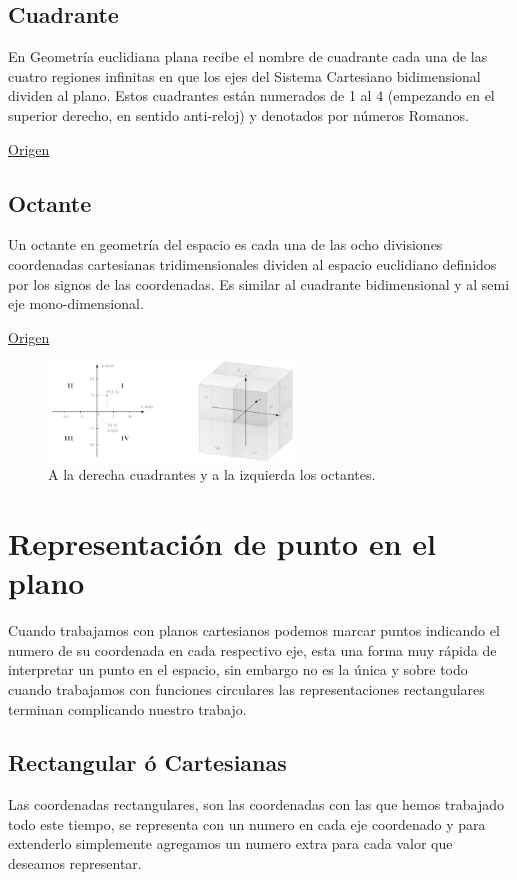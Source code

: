 \documentclass{article}
\begin{document}
\subsection{Cuadrante}
\label{sec:org30ba758}
En Geometría euclidiana plana recibe el nombre de cuadrante cada una de las cuatro regiones infinitas en que los ejes del Sistema Cartesiano bidimensional dividen al plano. Estos cuadrantes están numerados de 1 al 4 (empezando en el superior derecho, en sentido anti-reloj) y denotados por números Romanos.

\href{https://es.wikipedia.org/wiki/Cuadrante\_(geometr\%C3\%ADa)}{Origen}

\subsection{Octante}
\label{sec:org7738256}
Un octante en geometría del espacio es cada una de las ocho divisiones coordenadas cartesianas tridimensionales dividen al espacio euclidiano definidos por los signos de las coordenadas. Es similar al cuadrante bidimensional y al semi eje mono-dimensional.

\href{https://es.wikipedia.org/wiki/Octante\_(geometr\%C3\%ADa)}{Origen}

\begin{figure}[htbp]
\centering
\includegraphics[width=250px]{img/cuadrante-y-octante-2.png}
\caption{A la derecha cuadrantes y a la izquierda los octantes.}
\end{figure}

\section{Representación de punto en el plano}
\label{sec:org36f1d6f}
Cuando trabajamos con planos cartesianos podemos marcar puntos indicando el numero de su coordenada en cada respectivo eje, esta una forma muy rápida de interpretar un punto en el espacio, sin embargo no es la única y sobre todo cuando trabajamos con funciones circulares las representaciones rectangulares terminan complicando nuestro trabajo.

\subsection{Rectangular ó Cartesianas}
\label{sec:org8b6f930}
Las coordenadas rectangulares, son las coordenadas con las que hemos trabajado todo este tiempo, se representa con un numero en cada eje coordenado y para extenderlo simplemente agregamos un numero extra para cada valor que deseamos representar. 
\end{document}
